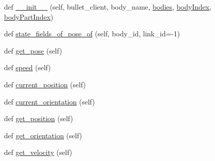 \begin{DoxyCompactItemize}
\item 
def \hyperlink{classpybullet-gym_1_1pybulletgym_1_1envs_1_1roboschool_1_1robots_1_1robot__bases_1_1_body_part_a080bf8eeb9cbae064c8133aa75abc45e}{\+\_\+\+\_\+init\+\_\+\+\_\+} (self, bullet\+\_\+client, body\+\_\+name, \hyperlink{classpybullet-gym_1_1pybulletgym_1_1envs_1_1roboschool_1_1robots_1_1robot__bases_1_1_body_part_a8b2d0098231e0f9ba7e1b1cf0411d54a}{bodies}, \hyperlink{classpybullet-gym_1_1pybulletgym_1_1envs_1_1roboschool_1_1robots_1_1robot__bases_1_1_body_part_a13d175a07a026c5a44c3a2536b028b2b}{body\+Index}, \hyperlink{classpybullet-gym_1_1pybulletgym_1_1envs_1_1roboschool_1_1robots_1_1robot__bases_1_1_body_part_ae54b20b5f49cb548ead79fda5dde8c4f}{body\+Part\+Index})
\item 
def \hyperlink{classpybullet-gym_1_1pybulletgym_1_1envs_1_1roboschool_1_1robots_1_1robot__bases_1_1_body_part_ae190f451705abcd20e22f26010e2a198}{state\+\_\+fields\+\_\+of\+\_\+pose\+\_\+of} (self, body\+\_\+id, link\+\_\+id=-\/1)
\item 
def \hyperlink{classpybullet-gym_1_1pybulletgym_1_1envs_1_1roboschool_1_1robots_1_1robot__bases_1_1_body_part_a76830189df385c167c41227a7662dc79}{get\+\_\+pose} (self)
\item 
def \hyperlink{classpybullet-gym_1_1pybulletgym_1_1envs_1_1roboschool_1_1robots_1_1robot__bases_1_1_body_part_a713b6a2250fd0938e9269c7e4b75d5fc}{speed} (self)
\item 
def \hyperlink{classpybullet-gym_1_1pybulletgym_1_1envs_1_1roboschool_1_1robots_1_1robot__bases_1_1_body_part_aa53bd19193d22c12489f2ed2bd5a1e7e}{current\+\_\+position} (self)
\item 
def \hyperlink{classpybullet-gym_1_1pybulletgym_1_1envs_1_1roboschool_1_1robots_1_1robot__bases_1_1_body_part_ae46aa5c96ea0d1704ff9f9ddb6cf0949}{current\+\_\+orientation} (self)
\item 
def \hyperlink{classpybullet-gym_1_1pybulletgym_1_1envs_1_1roboschool_1_1robots_1_1robot__bases_1_1_body_part_a745d6fab053c6513cba85e9e953cb029}{get\+\_\+position} (self)
\item 
def \hyperlink{classpybullet-gym_1_1pybulletgym_1_1envs_1_1roboschool_1_1robots_1_1robot__bases_1_1_body_part_acc4afd882fdb11b14d993633047e776f}{get\+\_\+orientation} (self)
\item 
def \hyperlink{classpybullet-gym_1_1pybulletgym_1_1envs_1_1roboschool_1_1robots_1_1robot__bases_1_1_body_part_a80207d9fc0a636f21ed4926db1ed7e45}{get\+\_\+velocity} (self)
\item 

\end{DoxyCompactItemize}
